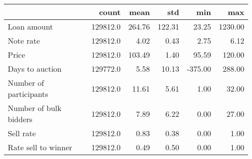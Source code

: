 \begin{tabular}{lrrrrr}
\toprule
{} &     count &    mean &     std &     min &      max \\
\midrule
Loan amount            &  129812.0 &  264.76 &  122.31 &   23.25 &  1230.00 \\
Note rate              &  129812.0 &    4.02 &    0.43 &    2.75 &     6.12 \\
Price                  &  129812.0 &  103.49 &    1.40 &   95.59 &   120.00 \\
Days to auction        &  129772.0 &    5.58 &   10.13 & -375.00 &   288.00 \\
Number of participants &  129812.0 &   11.61 &    5.61 &    1.00 &    32.00 \\
Number of bulk bidders &  129812.0 &    7.89 &    6.22 &    0.00 &    27.00 \\
Sell rate              &  129812.0 &    0.83 &    0.38 &    0.00 &     1.00 \\
Rate sell to winner    &  129812.0 &    0.49 &    0.50 &    0.00 &     1.00 \\
\bottomrule
\end{tabular}
